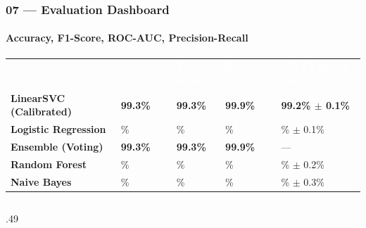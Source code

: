 \documentclass[aspectratio=169,10pt]{beamer}
\begin{document}
\begin{frame}[t]
\frametitle{07 --- Evaluation Dashboard}
\framesubtitle{Accuracy, F1-Score, ROC-AUC, Precision-Recall}
\vspace{.04cm}
\renewcommand{\arraystretch}{1.0}
{\footnotesize
\begin{tabularx}{\textwidth}{%
  >{\bfseries\color{Navy}}p{3.4cm}
  >{\centering\arraybackslash}X>{\centering\arraybackslash}X
  >{\centering\arraybackslash}X>{\centering\arraybackslash}X}
\rowcolor{Navy}
\textcolor{white}{\textbf{Model}}&\textcolor{white}{\textbf{Accuracy}}&
\textcolor{white}{\textbf{F1-Score}}&\textcolor{white}{\textbf{ROC-AUC}}&
\textcolor{white}{\textbf{CV F1 (mean$\pm$std)}}\\
\rowcolor{GreenL}
\textbf{LinearSVC (Calibrated)}&\textcolor{AGreen}{\textbf{99.3\%}}&
\textcolor{AGreen}{\textbf{99.3\%}}&\textcolor{AGreen}{\textbf{99.9\%}}&
\textcolor{AGreen}{\textbf{99.2\% $\pm$ 0.1\%}}\\
Logistic Regression&99.1\%&99.1\%&99.8\%&99.0\% $\pm$ 0.1\%\\
\rowcolor{GreenL}
\textbf{Ensemble (Voting)}&\textcolor{AGreen}{\textbf{99.3\%}}&
\textcolor{AGreen}{\textbf{99.3\%}}&\textcolor{AGreen}{\textbf{99.9\%}}&---\\
Random Forest&98.6\%&98.5\%&99.7\%&98.4\% $\pm$ 0.2\%\\
\rowcolor{SlateL}
Naive Bayes&95.8\%&95.7\%&99.2\%&95.6\% $\pm$ 0.3\%\\
\end{tabularx}}
\vspace{.08cm}
\begin{columns}[T]
\begin{column}{.49\textwidth}
  \begin{tcolorbox}[mycard={BlueMid}{ABlue},top=3pt,bottom=3pt]
    \\[4pt]
    \centering
\end{tcolorbox}
\end{column}
\end{columns}
\end{frame}
\end{document}
